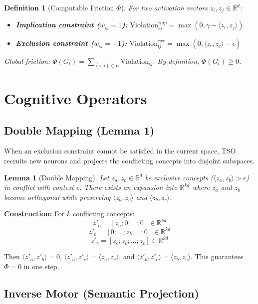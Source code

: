 \documentclass{article}
\newtheorem{lemma}{Lemma}
\newtheorem{definition}{Definition}
\begin{document}
\begin{definition}[Computable Friction $\Phi$]
For two activation vectors $z_i, z_j \in \mathbb{R}^d$:
\begin{itemize}
    \item \textbf{Implication constraint ($w_{ij}=1$):} $\text{Violation}_{ij}^{imp} = \max(0, \gamma - \langle z_i, z_j \rangle)$
    \item \textbf{Exclusion constraint ($w_{ij}=-1$):} $\text{Violation}_{ij}^{exc} = \max(0, \langle z_i, z_j \rangle - \epsilon)$
\end{itemize}
Global friction: $\Phi(G_t) = \sum_{(i,j) \in E} \text{Violation}_{ij}$. By definition, $\Phi(G_t) \ge 0$.
\end{definition}

\section{Cognitive Operators}

\subsection{Double Mapping (Lemma 1)}

When an exclusion constraint cannot be satisfied in the current space, TSO recruits new neurons and projects the conflicting concepts into disjoint subspaces.

\begin{lemma}[Double Mapping]
Let $z_a, z_b \in \mathbb{R}^d$ be exclusive concepts ($\langle z_a, z_b \rangle > \epsilon$) in conflict with context $c$. There exists an expansion into $\mathbb{R}^{kd}$ where $z_a$ and $z_b$ become orthogonal while preserving $\langle z_a, z_c \rangle$ and $\langle z_b, z_c \rangle$.
\end{lemma}

\textbf{Construction:} For $k$ conflicting concepts:
$$z'_a = [z_a; 0; \dots; 0] \in \mathbb{R}^{kd}$$
$$z'_b = [0; \dots; z_b; \dots; 0] \in \mathbb{R}^{kd}$$
$$z'_c = [z_c; z_c; \dots; z_c] \in \mathbb{R}^{kd}$$

Then $\langle z'_a, z'_b \rangle = 0$, $\langle z'_a, z'_c \rangle = \langle z_a, z_c \rangle$, and $\langle z'_b, z'_c \rangle = \langle z_b, z_c \rangle$. This guarantees $\Phi = 0$ in one step.

\subsection{Inverse Motor (Semantic Projection)}
\end{document}
